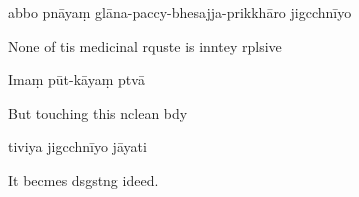 abbo pnāyaṃ glāna-paccy-bhesajja-prikkhāro jigcchnīyo

\begin{english}
  None of tis medicinal rquste is inntey rplsive
\end{english}

Imaṃ pūt-kāyaṃ ptvā

\begin{english}
  But touching this nclean bdy
\end{english}

tiviya jigcchnīyo jāyati

\begin{english}
  It becmes dsgstng ideed.
\end{english}

